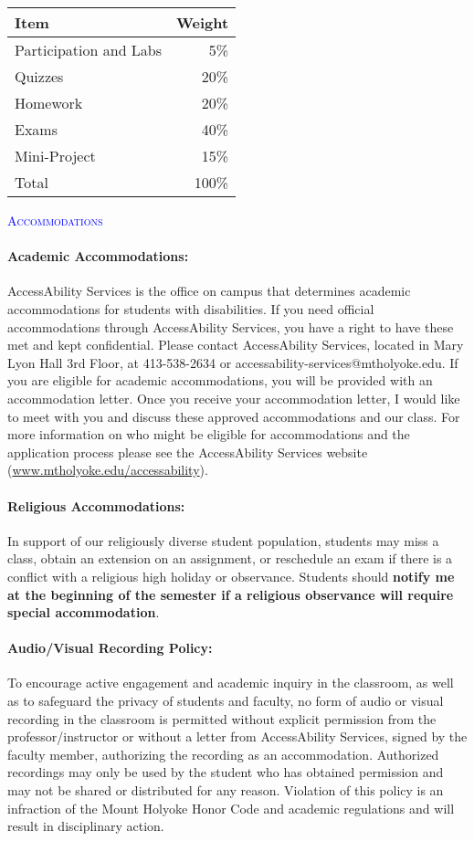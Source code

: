 \documentclass[12pt,a4paper]{article}
\begin{document}
\begin{table}[H]
\centering
\begin{tabular}{l r}
Item & Weight\\
\hline
Participation and Labs & 5\%\\
Quizzes & 20\%\\
Homework & 20\%\\
Exams & 40\%\\
Mini-Project & 15\%\\
\hline
Total & 100\%
\end{tabular}
\end{table}

\textcolor{blue}{\textsc{Accommodations}}

\paragraph{Academic Accommodations:} AccessAbility Services is the office on campus that determines academic accommodations for students with disabilities. If you need official accommodations through AccessAbility Services, you have a right to have these met and kept confidential. Please contact AccessAbility Services, located in Mary Lyon Hall 3rd Floor, at 413-538-2634 or accessability-services@mtholyoke.edu. If you are eligible for academic accommodations, you will be provided with an accommodation letter. Once you receive your accommodation letter, I would like to meet with you and discuss these approved accommodations and our class. For more information on who might be eligible for accommodations and the application process please see the AccessAbility Services website (\url{www.mtholyoke.edu/accessability}).

\paragraph{Religious Accommodations:} In support of our religiously diverse student population, students may miss a class, obtain an extension on an assignment, or reschedule an exam if there is a conflict with a religious high holiday or observance. Students should \textbf{notify me at the beginning of the semester if a religious observance will require special accommodation}. 

\paragraph{Audio/Visual Recording Policy:} To encourage active engagement and academic inquiry in the classroom, as well as to safeguard the privacy of students and faculty, no form of audio or visual recording in the classroom is permitted without explicit permission from the professor/instructor or without a letter from AccessAbility Services, signed by the faculty member, authorizing the recording as an accommodation. Authorized recordings may only be used by the student who has obtained permission and may not be shared or distributed for any reason. Violation of this policy is an infraction of the Mount Holyoke Honor Code and academic regulations and will result in disciplinary action.
\end{document}
